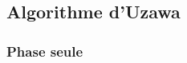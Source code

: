 \documentclass[11pt,a4paper]{article}
\begin{document}
\subsection*{Algorithme d'Uzawa}
\subsubsection*{Phase seule}
%
%
%	
%	
\end{document}

